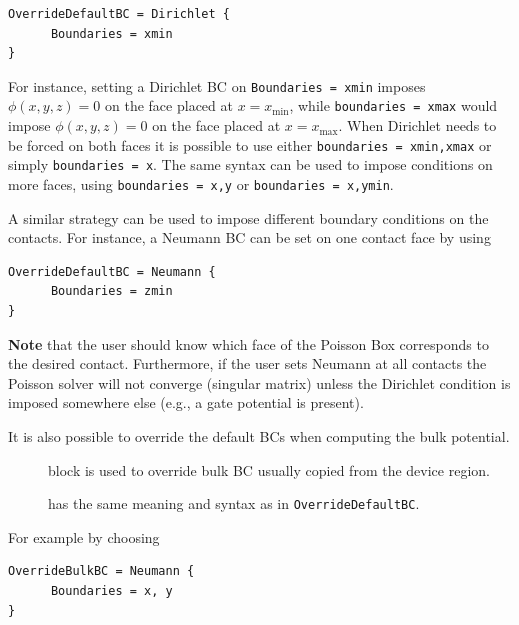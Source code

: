 \begin{verbatim}
OverrideDefaultBC = Dirichlet {
      Boundaries = xmin
}
\end{verbatim}

For instance, setting a Dirichlet BC on \verb|Boundaries = xmin| imposes
$\phi(x,y,z)=0$ on the face placed at $x=x_{\text{min}}$, while
\verb|boundaries = xmax| would impose $\phi(x,y,z)=0$ on the face placed at
$x=x_{\text{max}}$. When Dirichlet needs to be forced on both faces it is
possible to use either \verb|boundaries = xmin,xmax| or simply
\verb|boundaries = x|. The same syntax can be used to impose conditions on more
faces, using \verb|boundaries = x,y| or \verb|boundaries = x,ymin|.

A similar strategy can be used to impose different boundary conditions on the
contacts. For instance, a Neumann BC can be set on one contact face by using

\begin{verbatim}
OverrideDefaultBC = Neumann {
      Boundaries = zmin
}
\end{verbatim}

{\bf Note} that the user should know which face of the Poisson Box corresponds
to the desired contact. Furthermore, if the user sets Neumann at all contacts
the Poisson solver will not converge (singular matrix) unless the Dirichlet
condition is imposed somewhere else (e.g., a gate potential is present).

It is also possible to override the default BCs when computing the bulk
potential.

\begin{description}
\item[] block is used to override bulk BC usually copied from
  the device region.
\item[] has the same meaning and syntax as in
  \verb|OverrideDefaultBC|.
\end{description}

For example by choosing
\begin{verbatim}
OverrideBulkBC = Neumann {
      Boundaries = x, y
}
\end{verbatim}




